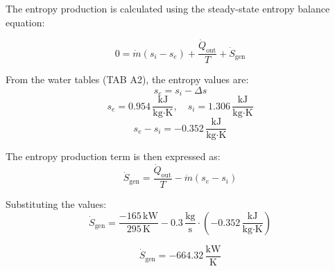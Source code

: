 The entropy production is calculated using the steady-state entropy balance equation:  

\[
0 = \dot{m}(s_i - s_e) + \frac{\dot{Q}_{\text{out}}}{T} + \dot{S}_{\text{gen}}
\]

From the water tables (TAB A2), the entropy values are:  
\[
s_e = s_i - \Delta s
\]
\[
s_e = 0.954 \, \frac{\text{kJ}}{\text{kg·K}}, \quad s_i = 1.306 \, \frac{\text{kJ}}{\text{kg·K}}
\]
\[
s_e - s_i = -0.352 \, \frac{\text{kJ}}{\text{kg·K}}
\]

The entropy production term is then expressed as:  
\[
\dot{S}_{\text{gen}} = \frac{\dot{Q}_{\text{out}}}{T} - \dot{m}(s_e - s_i)
\]

Substituting the values:  
\[
\dot{S}_{\text{gen}} = \frac{-165 \, \text{kW}}{295 \, \text{K}} - 0.3 \, \frac{\text{kg}}{\text{s}} \cdot (-0.352 \, \frac{\text{kJ}}{\text{kg·K}})
\]

\[
\dot{S}_{\text{gen}} = -664.32 \, \frac{\text{kW}}{\text{K}}
\]
